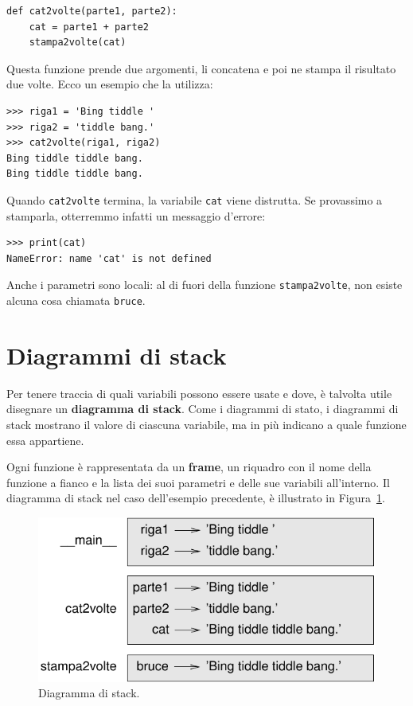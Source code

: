 \documentclass[10pt]{book}
\begin{document}
\begin{verbatim}
def cat2volte(parte1, parte2):
    cat = parte1 + parte2
    stampa2volte(cat)
\end{verbatim}
%
Questa funzione prende due argomenti, li concatena e poi ne stampa il risultato due volte. Ecco un esempio che la utilizza:

\begin{verbatim}
>>> riga1 = 'Bing tiddle '
>>> riga2 = 'tiddle bang.'
>>> cat2volte(riga1, riga2)
Bing tiddle tiddle bang.
Bing tiddle tiddle bang.
\end{verbatim}
%
Quando \verb"cat2volte" termina, la variabile {\tt cat} viene distrutta. Se provassimo a stamparla, otterremmo infatti un messaggio d'errore:

\begin{verbatim}
>>> print(cat)
NameError: name 'cat' is not defined
\end{verbatim}
%
Anche i parametri sono locali: al di fuori della funzione \verb"stampa2volte", non esiste alcuna cosa chiamata {\tt bruce}.


\section{Diagrammi di stack}
\label{stackdiagram}

Per tenere traccia di quali variabili possono essere usate e dove, è talvolta utile disegnare un {\bf diagramma di stack}. Come i diagrammi di stato, i diagrammi di stack mostrano il valore di ciascuna variabile, ma in più indicano a quale funzione essa appartiene.

Ogni funzione è rappresentata da un {\bf frame}, un riquadro con il nome della funzione a fianco e la lista dei suoi parametri e delle sue variabili all'interno. Il diagramma di stack nel caso dell'esempio precedente, è illustrato in Figura~\ref{fig.stack}.

\begin{figure}
\centerline
{\includegraphics[scale=0.8]{figs/stack.pdf}}
\caption{Diagramma di stack.}
\label{fig.stack}
\end{figure}
\end{document}
